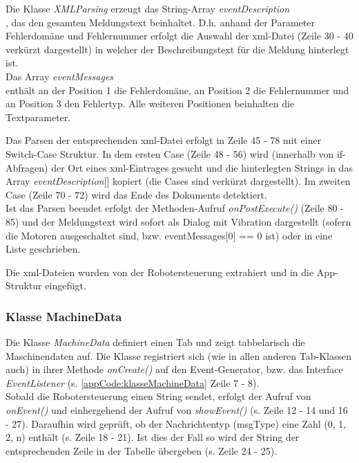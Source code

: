 Die Klasse \textit{XMLParsing} erzeugt das String-Array 
\textit{eventDescription\[\]}, das den gesamten Meldungstext 
beinhaltet. D.h. anhand der Parameter Fehlerdomäne und Fehlernummer erfolgt die 
Auswahl der xml-Datei (Zeile 30 - 40 verkürzt dargestellt) in welcher der 
Beschreibungstext für die Meldung hinterlegt ist.\\
Das Array \textit{eventMessages\[\]} enthält an der Position 1 die 
Fehlerdomäne, an Position 2 die Fehlernummer und an Position 3 den Fehlertyp. 
Alle weiteren Positionen beinhalten die Textparameter.

Das Parsen der entsprechenden xml-Datei erfolgt in Zeile 45 - 78 mit einer 
Switch-Case Struktur. In dem ersten Case (Zeile 48 - 56) wird (innerhalb von 
if-Abfragen) der Ort eines xml-Eintrages gesucht und die hinterlegten Strings 
in das Array \textit{eventDescription$[$$]$} kopiert (die Cases sind verkürzt 
dargestellt). Im zweiten Case (Zeile 70 - 72) wird das Ende des Dokuments 
detektiert.\\
Ist das Parsen beendet erfolgt der Methoden-Aufruf \textit{onPostExecute()} 
(Zeile 80 - 85) und der Meldungstext wird sofort als Dialog mit Vibration 
dargestellt (sofern die Motoren ausgeschaltet sind, bzw. eventMessages$[$0$]$ 
== 0 ist) oder in eine Liste geschrieben.

Die xml-Dateien wurden von der Robotersteuerung extrahiert und in die 
App-Struktur eingefügt.



\subsubsection{Klasse MachineData}
Die Klasse \textit{MachineData} definiert einen Tab und zeigt tabbelarisch die 
Maschinendaten auf. Die Klasse registriert sich (wie in allen anderen 
Tab-Klassen auch) in ihrer 
Methode \textit{onCreate()} auf den Event-Generator, bzw. das Interface 
\textit{EventListener} (s. \ref{appCode:klasseMachineData} Zeile 7 - 8).\\
Sobald die Robotersteuerung einen String sendet, erfolgt der Aufruf von 
\textit{onEvent()} und einhergehend der Aufruf von \textit{showEvent()} (s. 
Zeile 12 - 14 und 16 - 27). Daraufhin wird geprüft, ob der Nachrichtentyp 
(msgType) eine Zahl (0, 1, 2, n) enthält (s. Zeile 18 - 21). Ist dies der 
Fall so wird der 
String der entsprechenden Zeile in der Tabelle übergeben (s. Zeile 24 - 25).



